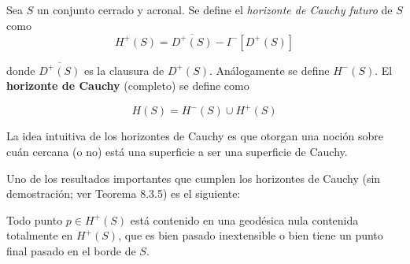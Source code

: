 \begin{definition}
Sea $S$ un conjunto cerrado y acronal. Se define el \textit{horizonte de Cauchy futuro} de $S$ como 
\[ H^+(S)=\overline{D^+(S)}-I^-[D^+(S)] \]
\end{definition}

donde $\overline{D^+(S)}$ es la clausura de $D^+(S)$. Análogamente se define $H^-(S)$. El \textbf{horizonte de Cauchy} (completo) se define como

\[ H(S)=H^-(S) \cup H^+(S) \]

La idea intuitiva de los horizontes de Cauchy es que otorgan una noción sobre cuán cercana (o no) está una superficie a ser una superficie de Cauchy.

Uno de los resultados importantes que cumplen los horizontes de Cauchy (sin demostración; ver \citep{1984ucp..book.....W} Teorema 8.3.5) es el siguiente:

\begin{theorem}\label{teo 8.3.5 Wald}
Todo punto $p\in H^+(S)$ está contenido en una geodésica nula contenida totalmente en $H^+(S)$, que es bien pasado inextensible o bien tiene un punto final pasado en el borde de $S$.
\end{theorem}


    
